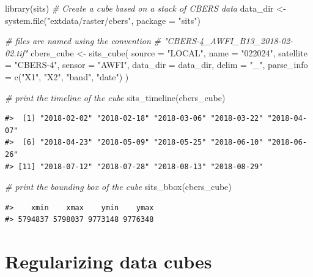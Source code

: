 \documentclass[a4paper,]{tufte-book}
\newenvironment{Shaded}{}{}
\newcommand{\AttributeTok}[1]{\textcolor[rgb]{0.49,0.56,0.16}{#1}}
\newcommand{\CommentTok}[1]{\textcolor[rgb]{0.38,0.63,0.69}{\textit{#1}}}
\newcommand{\FunctionTok}[1]{\textcolor[rgb]{0.02,0.16,0.49}{#1}}
\newcommand{\NormalTok}[1]{#1}
\newcommand{\OtherTok}[1]{\textcolor[rgb]{0.00,0.44,0.13}{#1}}
\newcommand{\StringTok}[1]{\textcolor[rgb]{0.25,0.44,0.63}{#1}}
\begin{document}
\begin{Shaded}
\begin{Highlighting}[]
\FunctionTok{library}\NormalTok{(sits)}
\CommentTok{\# Create a cube based on a stack of CBERS data}
\NormalTok{data\_dir }\OtherTok{\textless{}{-}} \FunctionTok{system.file}\NormalTok{(}\StringTok{"extdata/raster/cbers"}\NormalTok{, }\AttributeTok{package =} \StringTok{"sits"}\NormalTok{)}

\CommentTok{\# files are named using the convention }
\CommentTok{\# "CBERS{-}4\_AWFI\_B13\_2018{-}02{-}02.tif"}
\NormalTok{cbers\_cube }\OtherTok{\textless{}{-}} \FunctionTok{sits\_cube}\NormalTok{(}
      \AttributeTok{source =} \StringTok{"LOCAL"}\NormalTok{,}
      \AttributeTok{name =} \StringTok{"022024"}\NormalTok{,}
      \AttributeTok{satellite =} \StringTok{"CBERS{-}4"}\NormalTok{,}
      \AttributeTok{sensor =} \StringTok{"AWFI"}\NormalTok{,}
      \AttributeTok{data\_dir =}\NormalTok{ data\_dir,}
      \AttributeTok{delim =} \StringTok{"\_"}\NormalTok{,}
      \AttributeTok{parse\_info =} \FunctionTok{c}\NormalTok{(}\StringTok{"X1"}\NormalTok{, }\StringTok{"X2"}\NormalTok{, }\StringTok{"band"}\NormalTok{, }\StringTok{"date"}\NormalTok{)}
\NormalTok{)}

\CommentTok{\# print the timeline of the cube}
\FunctionTok{sits\_timeline}\NormalTok{(cbers\_cube)}
\end{Highlighting}
\end{Shaded}

\begin{verbatim}
#>  [1] "2018-02-02" "2018-02-18" "2018-03-06" "2018-03-22" "2018-04-07"
#>  [6] "2018-04-23" "2018-05-09" "2018-05-25" "2018-06-10" "2018-06-26"
#> [11] "2018-07-12" "2018-07-28" "2018-08-13" "2018-08-29"
\end{verbatim}

\begin{Shaded}
\begin{Highlighting}[]
\CommentTok{\# print the bounding box of the cube}
\FunctionTok{sits\_bbox}\NormalTok{(cbers\_cube)}
\end{Highlighting}
\end{Shaded}

\begin{verbatim}
#>    xmin    xmax    ymin    ymax 
#> 5794837 5798037 9773148 9776348
\end{verbatim}

\hypertarget{regularizing-data-cubes}{%
\section{Regularizing data cubes}\label{regularizing-data-cubes}}
\end{document}
